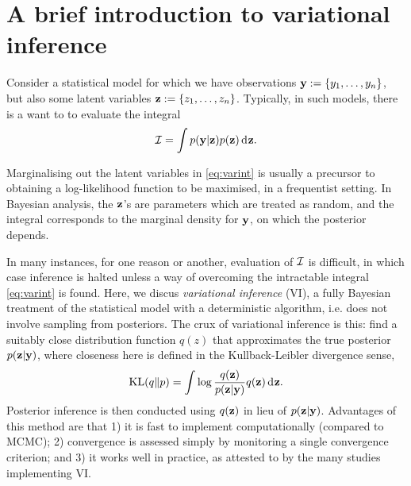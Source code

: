 \section{A brief introduction to variational inference}
\label{sec:varintro}

Consider a statistical model for which we have observations ${\mathbf y} := \{y_1,\dots,y_n\}$, but also some latent variables ${\mathbf z} := \{z_1,\dots,z_n\}$.
Typically, in such models, there is a want to to evaluate the integral 
\begin{equation}
  {\mathcal I} = \int p({\mathbf y}|{\mathbf z}) p({\mathbf z}) \operatorname{d}\hspace{0.5pt}\! {\mathbf z}.
\end{equation}

Marginalising out the latent variables in \cref{eq:varint} is usually a precursor to obtaining a log-likelihood function to be maximised, in a frequentist setting.
In Bayesian analysis, the ${\mathbf z}$'s are parameters which are treated as random, and the integral corresponds to the marginal density for ${\mathbf y}$, on which the posterior depends.

In many instances, for one reason or another, evaluation of ${\mathcal I}$ is difficult, in which case inference is halted unless a way of overcoming the intractable integral \cref{eq:varint} is found.
Here, we discus \emph{variational inference} (VI), a fully Bayesian treatment of the statistical model with a deterministic algorithm, i.e. does not involve sampling from posteriors.
The crux of variational inference is this: find a suitably close distribution function $q(z)$ that approximates the true posterior $p({\mathbf z}|{\mathbf y})$, where closeness here is defined in the Kullback-Leibler divergence sense,
\[
  \operatorname{KL}(q\Vert p) = \int \log \frac{q({\mathbf z})}{p({\mathbf z}|{\mathbf y})} q({\mathbf z}) \operatorname{d}\hspace{0.5pt}\! {\mathbf z}.
\]
Posterior inference is then conducted using $q({\mathbf z})$ in lieu of $p({\mathbf z}|{\mathbf y})$.
Advantages of this method are that 1) it is fast to implement computationally (compared to MCMC); 2) convergence is assessed simply by monitoring a single convergence criterion; and 3) it works well in practice, as attested to by the many studies implementing VI.


